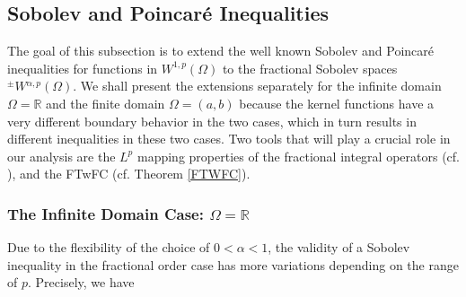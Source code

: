 \documentclass[leqno,final]{siamltex}
\numberwithin{equation}{section}
\renewcommand{\(}{\bigl(}
\renewcommand{\)}{\bigr)}
\newcommand{\R}{\mathbb{R}}
\begin{document}
    \subsection{Sobolev and Poincar\'e Inequalities}\label{sec-4.4}
   The goal of this subsection is to extend the well known Sobolev and Poincar\'e  inequalities  
   for functions in $W^{1,p}(\Omega)$ to the fractional Sobolev spaces 
   ${^{\pm}}{W}{^{\alpha,p}}(\Omega)$. We shall present the extensions separately for  
   the infinite domain $\Omega=\R$ and the finite domain $\Omega=(a,b)$ because the kernel functions 
   have a very different boundary behavior in the two cases, which in turn results in different inequalities 
   in these two cases. 
   Two tools that will play a crucial role in our analysis are the $L^{p}$ mapping properties 
   of the fractional integral operators (cf. \cite[Theorem 2.6]{Feng_Sutton}),    
   and the  FTwFC (cf. Theorem \ref{FTWFC}). 
 
   \subsubsection{\bf The Infinite Domain Case: $\Omega=\R$}\label{sec-4.4.1}
   Due to the flexibility of the choice of $0<\alpha <1$, the validity of a Sobolev 
   inequality in the fractional order
   case has more variations depending on the range of $p$. Precisely, we have  
   
\end{document}
